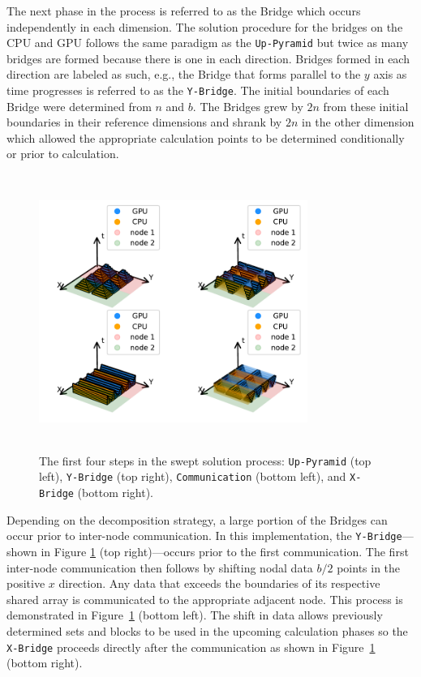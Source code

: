 \documentclass[preprints,article,accept,moreauthors,pdftex]{Definitions/mdpi}
\def\Up{\texttt{Up-Pyramid}}
\def\Xb{\texttt{X-Bridge}}
\def\Yb{\texttt{Y-Bridge}}
\begin{document}
\par The next phase in the process is referred to as the Bridge which occurs independently in each dimension. The solution procedure for the bridges on the CPU and GPU follows the same paradigm as the \Up{} but twice as many bridges are formed because there is one in each direction. Bridges formed in each direction are labeled as such, e.g., the Bridge that forms parallel to the $y$ axis as time progresses is referred to as the \Yb{}. The initial boundaries of each Bridge were determined from $n$ and $b$. The Bridges grew by $2n$ from these initial boundaries in their reference dimensions and shrank by $2n$ in the other dimension which allowed the appropriate calculation points to be determined conditionally or prior to calculation.

\begin{figure}[H]
    \begin{center}
        \includegraphics[height=9cm,width=0.78\textwidth, trim={1cm 0.6cm 0.25cm 0.2cm},clip]{figs/SubsPlot1.pdf}
    \end{center}
    \caption{The first four steps in the swept solution process: \Up{} (top left), \Yb{} (top right), \texttt{Communication} (bottom left), and \Xb{} (bottom right).}
    \label{fig:MainOne}
\end{figure}

\par
Depending on the decomposition strategy, a large portion of the Bridges can occur prior to inter-node communication. In this implementation, the \Yb{}---shown in Figure \ref{fig:MainOne} (top right)---occurs prior to the first communication. The first inter-node communication then follows by shifting nodal data $b/2$ points in the positive $x$ direction. Any data that exceeds the boundaries of its respective shared array is communicated to the appropriate adjacent node. This process is demonstrated in Figure~\ref{fig:MainOne} (bottom left). The shift in data allows previously determined sets and blocks to be used in the upcoming calculation phases so the \Xb{} proceeds directly after the communication as shown in Figure~\ref{fig:MainOne} (bottom right).
\end{document}
